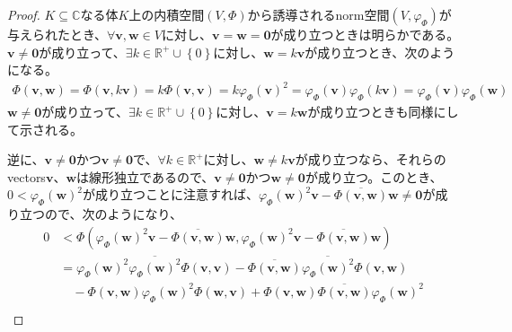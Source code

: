 \documentclass[dvipdfmx]{jsarticle}
\begin{document}
\begin{proof}
$K \subseteq \mathbb{C}$なる体$K$上の内積空間$(V,\varPhi)$から誘導されるnorm空間$\left( V,\varphi_{\varPhi} \right)$が与えられたとき、$\forall\mathbf{v},\mathbf{w} \in V$に対し、$\mathbf{v} = \mathbf{w} = \mathbf{0}$が成り立つときは明らかである。$\mathbf{v} \neq \mathbf{0}$が成り立って、$\exists k \in \mathbb{R}^{+} \cup \left\{ 0 \right\}$に対し、$\mathbf{w} = k\mathbf{v}$が成り立つとき、次のようになる。
\begin{align*}
\varPhi\left( \mathbf{v},\mathbf{w} \right) = \varPhi\left( \mathbf{v},k\mathbf{v} \right) = k\varPhi\left( \mathbf{v},\mathbf{v} \right) = k{\varphi_{\varPhi}\left( \mathbf{v} \right)}^{2} = \varphi_{\varPhi}\left( \mathbf{v} \right)\varphi_{\varPhi}\left( k\mathbf{v} \right) = \varphi_{\varPhi}\left( \mathbf{v} \right)\varphi_{\varPhi}\left( \mathbf{w} \right)
\end{align*}
$\mathbf{w} \neq \mathbf{0}$が成り立って、$\exists k \in \mathbb{R}^{+} \cup \left\{ 0 \right\}$に対し、$\mathbf{v} = k\mathbf{w}$が成り立つときも同様にして示される。\par
逆に、$\mathbf{v} \neq \mathbf{0}$かつ$\mathbf{v} \neq \mathbf{0}$で、$\forall k \in \mathbb{R}^{+}$に対し、$\mathbf{w} \neq k\mathbf{v}$が成り立つなら、それらのvectors$\mathbf{v}$、$\mathbf{w}$は線形独立であるので、$\mathbf{v} \neq \mathbf{0}$かつ$\mathbf{w} \neq \mathbf{0}$が成り立つ。このとき、$0 < {\varphi_{\varPhi}\left( \mathbf{w} \right)}^{2}$が成り立つことに注意すれば、${\varphi_{\varPhi}\left( \mathbf{w} \right)}^{2}\mathbf{v} - \overline{\varPhi\left( \mathbf{v},\mathbf{w} \right)}\mathbf{w} \neq \mathbf{0}$が成り立つので、次のようになり、
\begin{align*}
0 &< \varPhi\left( {\varphi_{\varPhi}\left( \mathbf{w} \right)}^{2}\mathbf{v} - \overline{\varPhi\left( \mathbf{v},\mathbf{w} \right)}\mathbf{w,}{\varphi_{\varPhi}\left( \mathbf{w} \right)}^{2}\mathbf{v} - \overline{\varPhi\left( \mathbf{v},\mathbf{w} \right)}\mathbf{w} \right)\\
&= {\varphi_{\varPhi}\left( \mathbf{w} \right)}^{2}\overline{{\varphi_{\varPhi}\left( \mathbf{w} \right)}^{2}}\varPhi\left( \mathbf{v,v} \right) - \overline{\varPhi\left( \mathbf{v},\mathbf{w} \right)}\overline{{\varphi_{\varPhi}\left( \mathbf{w} \right)}^{2}}\varPhi\left( \mathbf{v,w} \right) \\
&\quad - \varPhi\left( \mathbf{v},\mathbf{w} \right){\varphi_{\varPhi}\left( \mathbf{w} \right)}^{2}\varPhi\left( \mathbf{w,v} \right) + \varPhi\left( \mathbf{v},\mathbf{w} \right)\overline{\varPhi\left( \mathbf{v},\mathbf{w} \right)}{\varphi_{\varPhi}\left( \mathbf{w} \right)}^{2}\\

\end{align*}
\end{proof}
\end{document}
